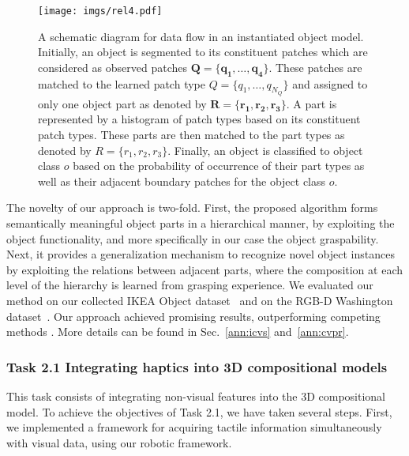 \documentclass[a4paper,11pt,pdf]{pacmanreport}
\begin{document}
\begin{figure}[h!]
\begin{center}
\texttt{[image: imgs/rel4.pdf]}
\end{center}
\caption{A schematic diagram for data flow in an instantiated object model. Initially, an object is segmented to its constituent patches which are considered as observed patches $\mathbf{Q}=\{\mathbf{q_1},\ldots,\mathbf{q_4}\}$. These patches are matched to the learned patch type $Q=\{q_1,\ldots,q_{N_{Q}}\}$ and assigned to only one object part as denoted by $\mathbf{R}=\{\mathbf{r_1},\mathbf{r_2},\mathbf{r_3}\}$. A part is represented by a histogram of patch types based on its constituent patch types. These parts are then matched to the part types as denoted by $R=\{r_1,r_2,r_3\}$. Finally, an object is classified to object class $o$ based on the probability of occurrence of their part types as well as their adjacent boundary patches for the object class $o$.} 
\label{fig:rel3}
\end{figure}

The novelty of our approach is two-fold. First, the proposed algorithm forms semantically meaningful object parts in a hierarchical manner, by exploiting the object functionality, and more specifically in our case the object graspability. Next, it provides a generalization mechanism to recognize novel object instances by exploiting the relations between adjacent parts, where the composition at each level of the hierarchy is learned from grasping experience. We evaluated our method on our collected IKEA Object dataset~\cite{website} and on the RGB-D Washington dataset~\cite{rgbd-dataset}. Our approach achieved promising results, outperforming competing methods \cite{rel7}.
More details can be found in Sec.~\ref{ann:icvs} and~\ref{ann:cvpr}. %


\subsubsection{Task 2.1 Integrating haptics into 3D compositional models}

This task consists of integrating non-visual features into the 3D 
compositional model. To achieve the objectives of Task 2.1, we have taken several steps. First, we implemented a framework for acquiring tactile information simultaneously with visual data, using our robotic framework. 
\end{document}
